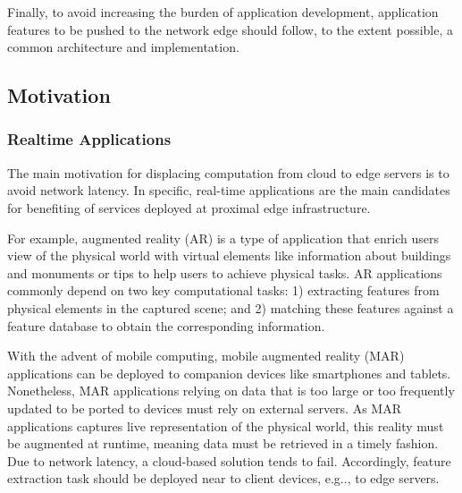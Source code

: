 Finally, to avoid increasing the burden of application development, application features to be pushed to the network edge should follow, to the extent possible, a common architecture and implementation.  

\subsection{Motivation}

\subsubsection{Realtime Applications}

The main motivation for displacing computation from cloud to edge servers is to avoid network latency. In specific, real-time applications are the main candidates for benefiting of services deployed at proximal edge infrastructure.

For example, augmented reality (AR) is a type of application that enrich users view of the physical world with virtual elements like information about buildings and monuments or tips to help users to achieve physical tasks. AR applications commonly depend on two key computational tasks: 1) extracting features from physical elements in the captured scene; and 2) matching these features against a feature database to obtain the corresponding information. 

With the advent of mobile computing,  mobile augmented reality (MAR) applications can be deployed to companion devices like smartphones and tablets. Nonetheless, MAR applications relying on data that is too large or too frequently updated to be ported to devices must rely on external servers. As MAR applications captures live representation of the physical world, this reality must be augmented at runtime, meaning data must be retrieved in a timely fashion. Due to network latency, a cloud-based solution tends to fail. Accordingly, feature extraction task should be deployed near to client devices, e.g.., to edge servers. 

